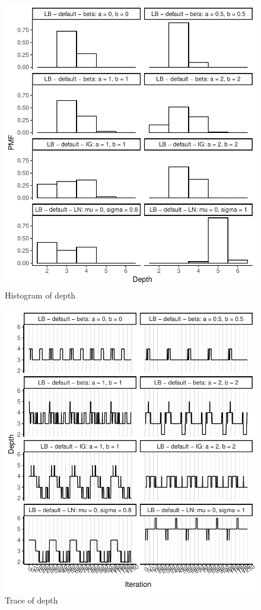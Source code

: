 \documentclass{amsart}
\begin{document}
\begin{figure}[ht]
	\centering
	\includegraphics[width=0.95\linewidth]{hist_depth_1.pdf}
	\caption{Histogram of depth}
	\label{fig:hist:depth:1}
\end{figure}

\begin{figure}[ht]
	\centering
	\includegraphics[width=0.95\linewidth]{trace_depth_1.pdf}
	\caption{Trace of depth}
	\label{fig:trace:depth:1}
\end{figure}
\end{document}
